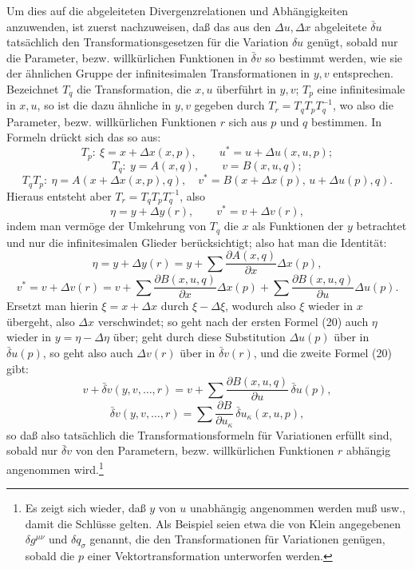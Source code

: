 \documentclass[11pt]{article}
\newcommand{\D}{\Delta}
\newcommand{\bd}{\bar{\delta}}
\newcommand{\p}{\partial}
\begin{document}
Um dies auf die abgeleiteten Divergenzrelationen und Abhängigkeiten anzuwenden, ist zuerst nachzuweisen, daß das aus den \(\D u,\D x\) abgeleitete \(\bd u\) tatsächlich den Transformationsgesetzen für die Variation \(\delta u\) genügt, sobald nur die Parameter, bezw. willkürlichen Funktionen in \(\bd v\) so bestimmt werden, wie sie der ähnlichen Gruppe der infinitesimalen Transformationen in \(y,v\) entsprechen. Bezeichnet \(T_q\) die Transformation, die \(x,u\) überführt in \(y,v\); \(T_p\) eine infinitesimale in \(x,u\), so ist die dazu ähnliche in \(y,v\) gegeben durch \(T_r=T_qT_pT_q^{-1}\), wo also die Parameter, bezw. willkürlichen Funktionen \(r\) sich aus \(p\) und \(q\) bestimmen. In Formeln drückt sich das so aus:
\[
T_p:\ \xi=x+\D x(x,p),\qquad u^*=u+\D u(x,u,p);
\]
\[
T_q:\ y=A(x,q),\qquad v=B(x,u,q);
\]
\[
T_qT_p:\ \eta=A(x+\D x(x,p),q),\quad
v^*=B(x+\D x(p),\,u+\D u(p),q).
\]
Hieraus entsteht aber \(T_r=T_qT_pT_q^{-1}\), also
\[
\eta=y+\D y(r),\qquad v^*=v+\D v(r),
\]
indem man vermöge der Umkehrung von \(T_q\) die \(x\) als Funktionen der \(y\) betrachtet und nur die infinitesimalen Glieder berücksichtigt; also hat man die Identität:
\begin{equation}
\eta=y+\D y(r)=y+\sum\frac{\p A(x,q)}{\p x}\D x(p),
\tag{20a}
\end{equation}
\begin{equation}
v^*=v+\D v(r)=v+\sum\frac{\p B(x,u,q)}{\p x}\D x(p)
+\sum\frac{\p B(x,u,q)}{\p u}\D u(p).
\tag{20b}
\end{equation}
Ersetzt man hierin \(\xi=x+\D x\) durch \(\xi-\D \xi\), wodurch also \(\xi\) wieder in \(x\) übergeht, also \(\D x\) verschwindet; so geht nach der ersten Formel (20) auch \(\eta\) wieder in \(y=\eta-\D\eta\) über; geht durch diese Substitution \(\D u(p)\) über in \(\bd u(p)\), so geht also auch \(\D v(r)\) über in \(\bd v(r)\), und die zweite Formel (20) gibt:
\[
v+\bd v(y,v,\ldots,r)=v+\sum\frac{\p B(x,u,q)}{\p u}\,\bd u(p),
\]
\[
\bd v(y,v,\ldots,r)=\sum\frac{\p B}{\p u_\kappa}\,\bd u_\kappa(x,u,p),
\]
so daß also tatsächlich die Transformationsformeln für Variationen erfüllt sind, sobald nur \(\bd v\) von den Parametern, bezw. willkürlichen Funktionen \(r\) abhängig angenommen wird.\footnote{Es zeigt sich wieder, daß \(y\) von \(u\) unabhängig angenommen werden muß usw., damit die Schlüsse gelten. Als Beispiel seien etwa die von Klein angegebenen \(\delta g^{\mu\nu}\) und \(\delta q_\sigma\) genannt, die den Transformationen für Variationen genügen, sobald die \(p\) einer Vektortransformation unterworfen werden.}
\end{document}
